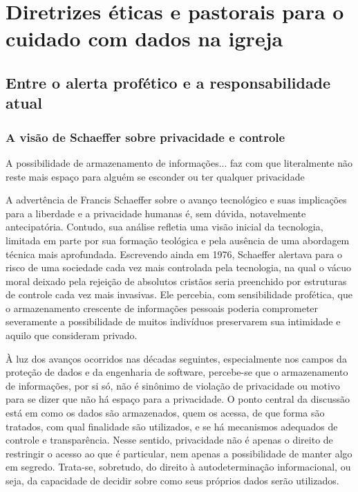 \chapter{Diretrizes éticas e pastorais para o cuidado com dados na igreja}
\section{Entre o alerta profético e a responsabilidade atual}

\subsection{A visão de Schaeffer sobre privacidade e controle}

\begin{citacao}
    A possibilidade de armazenamento de informações... faz com que literalmente não reste mais espaço para alguém se esconder ou ter qualquer privacidade \cite[p.~165]{schaeffer2002}
\end{citacao}

A advertência de Francis Schaeffer sobre o avanço tecnológico e suas implicações para a liberdade e a privacidade humanas é, sem dúvida, notavelmente antecipatória. Contudo, sua análise refletia uma visão inicial da tecnologia, limitada em parte por sua formação teológica e pela ausência de uma abordagem técnica mais aprofundada. Escrevendo ainda em 1976, Schaeffer alertava para o risco de uma sociedade cada vez mais controlada pela tecnologia, na qual o vácuo moral deixado pela rejeição de absolutos cristãos seria preenchido por estruturas de controle cada vez mais invasivas. Ele percebia, com sensibilidade profética, que o armazenamento crescente de informações pessoais poderia comprometer severamente a possibilidade de muitos indivíduos preservarem sua intimidade e aquilo que consideram privado.

À luz dos avanços ocorridos nas décadas seguintes, especialmente nos campos da proteção de dados e da engenharia de software, percebe-se que o armazenamento de informações, por si só, não é sinônimo de violação de privacidade ou motivo para se dizer que não há espaço para a privacidade. O ponto central da discussão está em como os dados são armazenados, quem os acessa, de que forma são tratados, com qual finalidade são utilizados, e se há mecanismos adequados de controle e transparência. Nesse sentido, privacidade não é apenas o direito de restringir o acesso ao que é particular, nem apenas a possibilidade de manter algo em segredo. Trata-se, sobretudo, do direito à autodeterminação informacional, ou seja, da capacidade de decidir sobre como seus próprios dados serão utilizados.

